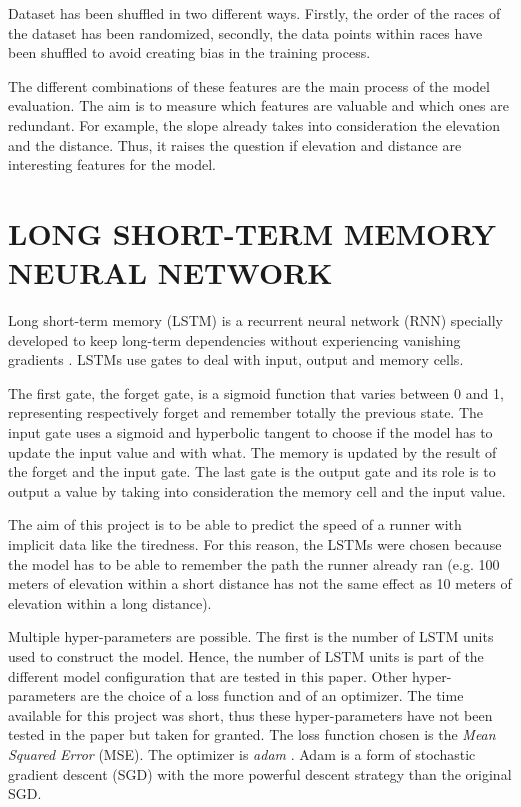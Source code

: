 \documentclass[a4paper, 10pt, conference]{ieeeconf}      %
\begin{document}
Dataset has been shuffled in two different ways. Firstly, the order of the races of the dataset has been randomized, secondly, the data points within races have been shuffled to avoid creating bias in the training process.

The different combinations of these features are the main process of the model evaluation. The aim is to measure which features are valuable and which ones are redundant. For example, the slope already takes into consideration the elevation and the distance. Thus, it raises the question if elevation and distance are interesting features for the model.

\section{LONG SHORT-TERM MEMORY NEURAL NETWORK}

Long short-term memory (LSTM) is a recurrent neural network (RNN) specially developed to keep long-term dependencies without experiencing vanishing gradients \cite{lstm}.
LSTMs use gates to deal with input, output and memory cells.

The first gate, the forget gate, is a sigmoid function that varies between 0 and 1, representing respectively forget and remember totally the previous state. The input gate uses a sigmoid and hyperbolic tangent to choose if the model has to update the input value and with what. The memory is updated by the result of the forget and the input gate. The last gate is the output gate and its role is to output a value by taking into consideration the memory cell and the input value.

The aim of this project is to be able to predict the speed of a runner with implicit data like the tiredness. For this reason, the LSTMs were chosen because the model has to be able to remember the path the runner already ran (e.g. 100 meters of elevation within a short distance has not the same effect as 10 meters of elevation within a long distance).

Multiple hyper-parameters are possible. The first is the number of LSTM units used to construct the model. Hence, the number of LSTM units is part of the different model configuration that are tested in this paper. Other hyper-parameters are the choice of a loss function and of an optimizer. The time available for this project was short, thus these hyper-parameters have not been tested in the paper but taken for granted. The loss function chosen is the \textit{Mean Squared Error} (MSE). The optimizer is \textit{adam} \cite{adam}. Adam is a form of stochastic gradient descent (SGD) with the more powerful descent strategy than the original SGD.
\end{document}
